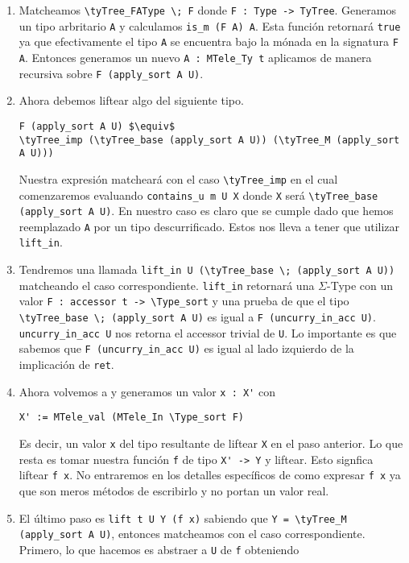 \begin{enumerate}
    \item Matcheamos \lstinline{\tyTree_FAType \; F} donde \lstinline{F : Type -> TyTree}. Generamos un tipo arbritario \lstinline{A} y calculamos \lstinline{is_m (F A) A}. Esta función retornará \lstinline{true} ya que efectivamente el tipo \lstinline{A} se encuentra bajo la mónada en la signatura \lstinline{F A}. Entonces generamos un nuevo \lstinline{A : MTele_Ty t} aplicamos \lift de manera recursiva sobre \lstinline{F (apply_sort A U)}.
    \item Ahora debemos liftear algo del siguiente tipo.
    \begin{lstlisting}
F (apply_sort A U) $\equiv$
\tyTree_imp (\tyTree_base (apply_sort A U)) (\tyTree_M (apply_sort A U)))
    \end{lstlisting}
    Nuestra expresión matcheará con el caso \lstinline{\tyTree_imp} en el cual comenzaremos evaluando \lstinline{contains_u m U X} donde \lstinline{X} será \lstinline{\tyTree_base (apply_sort A U)}. En nuestro caso es claro que se cumple dado que hemos reemplazado \lstinline{A} por un tipo descurrificado. Estos nos lleva a tener que utilizar \lstinline{lift_in}.
    \item Tendremos una llamada \lstinline{lift_in U (\tyTree_base \; (apply_sort A U))} matcheando el caso correspondiente.
    \lstinline{lift_in} retornará una $\Sigma$-Type con un valor \lstinline{F : accessor t -> \Type_sort} y una prueba de que el tipo \lstinline{\tyTree_base \; (apply_sort A U)} es igual a \lstinline{F (uncurry_in_acc U)}. \lstinline{uncurry_in_acc U} nos retorna el accessor trivial de \lstinline{U}. Lo importante es que sabemos que \lstinline{F (uncurry_in_acc U)} es igual al lado izquierdo de la implicación de \lstinline{ret}.
    \item Ahora volvemos a \lift y generamos un valor \lstinline{x : X'} con
    \begin{lstlisting}
X' := MTele_val (MTele_In \Type_sort F)
    \end{lstlisting}
    Es decir, un valor \lstinline{x} del tipo resultante de liftear \lstinline{X} en el paso anterior. Lo que resta es tomar nuestra función \lstinline{f} de tipo \lstinline{X' -> Y} y liftear. Esto signfica liftear \lstinline{f x}. No entraremos en los detalles específicos de como expresar \lstinline{f x} ya que son meros métodos de escribirlo y no portan un valor real.
    \item El último paso es \lstinline{lift t U Y (f x)} sabiendo que \lstinline{Y = \tyTree_M (apply_sort A U)}, entonces matcheamos con el caso correspondiente. Primero, lo que hacemos es abstraer a \lstinline{U} de \lstinline{f} obteniendo

\end{enumerate}
